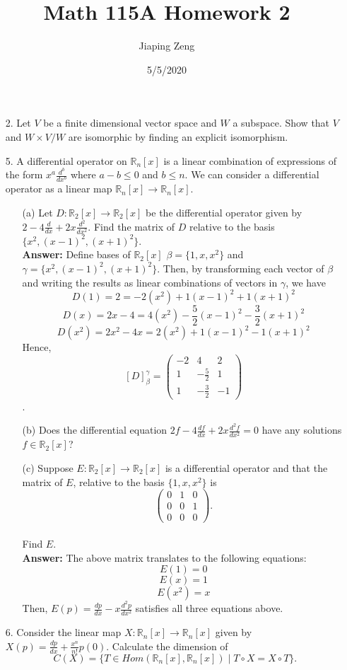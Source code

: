 \documentclass{article}
\title{Math 115A Homework 2}
\date{5/5/2020}
\author{Jiaping Zeng}
\begin{document}
\maketitle

\begin{itemize}
	\item [2.] Let $V$ be a finite dimensional vector space and $W$ a subspace. Show that $V$ and $W \times V/W$ are isomorphic by finding an explicit isomorphism.
	\item [5.] A differential operator on $\mathbb{R}_n[x]$ is a linear combination of expressions of the form $x^a\frac{d^b}{dx^b}$ where $a-b \leq 0$ and $b \leq n$. We can consider a differential operator as a linear map $\mathbb{R}_n[x]\rightarrow\mathbb{R}_n[x]$.
	      \begin{itemize}
		      \item [(a)] Let $D:\mathbb{R}_2[x]\rightarrow\mathbb{R}_2[x]$ be the differential operator given by $2-4\frac{d}{dx}+2x\frac{d^2}{dx^2}$. Find the matrix of $D$ relative to the basis $\{x^2, (x-1)^2, (x+1)^2\}$.\\
			  \textbf{Answer: } Define bases of $\mathbb{R}_2[x]$ $\beta=\{1,x,x^2\}$ and $\gamma=\{x^2,(x-1)^2,(x+1)^2\}$. Then, by transforming each vector of $\beta$ and writing the results as linear combinations of vectors in $\gamma$, we have \[D(1)=2=-2(x^2)+1(x-1)^2+1(x+1)^2\]\[D(x)=2x-4=4(x^2)-\frac{5}{2}(x-1)^2-\frac{3}{2}(x+1)^2\]\[D(x^2)=2x^2-4x=2(x^2)+1(x-1)^2-1(x+1)^2\]Hence, \[[D]_{\beta}^{\gamma}=\begin{pmatrix}-2&4&2\\1&-\frac{5}{2}&1\\1&-\frac{3}{2}&-1\end{pmatrix}\].
		      \item [(b)] Does the differential equation $2f-4\frac{df}{dx}+2x\frac{d^2f}{dx^2}=0$ have any solutions $f \in \mathbb{R}_2[x]$?
		      \item [(c)] Suppose $E:\mathbb{R}_2[x]\rightarrow\mathbb{R}_2[x]$ is a differential operator and that the matrix of $E$, relative to the basis $\{1,x,x^2\}$ is \[\begin{pmatrix}0&1&0\\0&0&1\\0&0&0\end{pmatrix}.\]\\Find $E$.\\
		      \textbf{Answer: } The above matrix translates to the following equations: \[E(1)=0\]\[E(x)=1\]\[E(x^2)=x\] Then, $E(p)=\frac{dp}{dx}-x\frac{d^2p}{dx^2}$ satisfies all three equations above.
	      \end{itemize}
	\item [6.] Consider the linear map $X:\mathbb{R}_n[x]\rightarrow\mathbb{R}_n[x]$ given by $X(p)=\frac{dp}{dx}+\frac{x^n}{n!}p(0)$. Calculate the dimension of \[C(X)=\{T\in Hom(\mathbb{R}_n[x],\mathbb{R}_n[x])\mid T\circ X=X\circ T\}.\]
\end{itemize}
\end{document}
